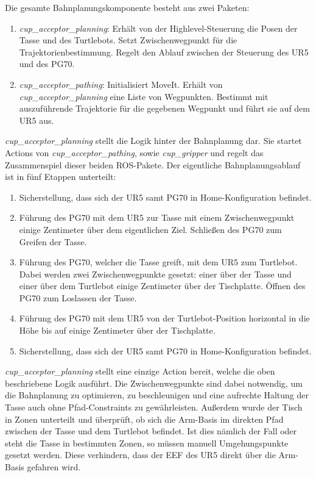 Die gesamte Bahnplanungskomponente besteht aus zwei Paketen:
\begin{enumerate}
	\item \textit{cup\_acceptor\_planning}:
				\newline
				Erhält von der Highlevel-Steuerung die Posen der Tasse und des Turtlebots. Setzt Zwischenwegpunkt für die Trajektorienbestimmung. Regelt den Ablauf zwischen der Steuerung des UR5 und des PG70.
	\item \textit{cup\_acceptor\_pathing}:
				\newline
				Initialisiert MoveIt. Erhält von \textit{cup\_acceptor\_planning} eine Liste von Wegpunkten. Bestimmt mit auszuführende Trajektorie für die gegebenen Wegpunkt und führt sie auf dem UR5 aus.
\end{enumerate}
\textit{cup\_acceptor\_planning} stellt die Logik hinter der Bahnplanung dar. Sie startet Actions von \textit{cup\_acceptor\_pathing}, sowie \textit{cup\_gripper} und regelt das Zusammenspiel dieser beiden ROS-Pakete. Der eigentliche Bahnplanungsablauf ist in fünf Etappen unterteilt:
\begin{enumerate}
	\item Sicherstellung, dass sich der UR5 samt PG70 in Home-Konfiguration befindet.
	\item Führung des PG70 mit dem UR5 zur Tasse mit einem Zwischenwegpunkt einige Zentimeter über dem eigentlichen Ziel. Schließen des PG70 zum Greifen der Tasse.
	\item Führung des PG70, welcher die Tasse greift, mit dem UR5 zum Turtlebot. Dabei werden zwei Zwischenwegpunkte gesetzt: einer über der Tasse und einer über dem Turtlebot einige Zentimeter über der Tischplatte. Öffnen des PG70 zum Loslassen der Tasse.
	\item Führung des PG70 mit dem UR5 von der Turtlebot-Position horizontal in die Höhe bis auf einige Zentimeter über der Tischplatte.
	\item Sicherstellung, dass sich der UR5 samt PG70 in Home-Konfiguration befindet.
\end{enumerate}
\textit{cup\_acceptor\_planning} stellt eine einzige Action bereit, welche die oben beschriebene Logik ausführt. Die Zwischenwegpunkte sind dabei notwendig, um die Bahnplanung zu optimieren, zu beschleunigen und eine aufrechte Haltung der Tasse auch ohne Pfad-Constraints zu gewährleisten. Außerdem wurde der Tisch in Zonen unterteilt und überprüft, ob sich die Arm-Basis im direkten Pfad zwischen der Tasse und dem Turtlebot befindet. Ist dies nämlich der Fall oder steht die Tasse in bestimmten Zonen, so müssen manuell Umgehungspunkte gesetzt werden. Diese verhindern, dass der EEF des UR5 direkt über die Arm-Basis gefahren wird.
